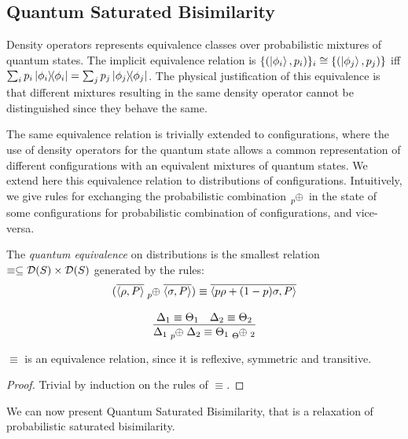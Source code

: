 
\subsection{Quantum Saturated Bisimilarity}

Density operators represents equivalence classes over probabilistic mixtures of quantum states.
The implicit equivalence relation is $\{(\ket{\phi_i}, p_i)\}_i \cong \{(\ket{\phi_j}, p_j)\}$ iff $\sum_{i} p_i \ket{\phi_i}\!\!\bra{\phi_i} = \sum_{j} p_j \ket{\phi_j}\!\!\bra{\phi_j}$.
The physical justification of this equivalence is that different mixtures resulting in the same density operator cannot be distinguished since they behave the same.

The same equivalence relation is trivially extended to configurations, where the use of density operators for the quantum state allows a common representation of different configurations with an equivalent mixtures of quantum states. 
We extend here this equivalence relation to distributions of configurations.
Intuitively, we give rules for exchanging the probabilistic combination $\psum{p}$ in the state of some configurations for probabilistic combination of configurations, and vice-versa. 

\begin{definition}
	The \emph{quantum equivalence} on distributions is the smallest  relation  $\equiv \subseteq \mathcal{D}(S) \times \mathcal{D}(S)$ generated by the rules:
	\begin{gather*}
	(\overline{\confw{\rho, P}} \psum{p} \overline{\confw{\sigma, P}}) \equiv \overline{\confw{p \rho + (1-p)\sigma, P}}
	\\[0.3cm]
	\infer{\Delta_1 \psum{p} \Delta_2 \equiv \Theta_1 \psum \Theta_2}{\Delta_1 \equiv \Theta_1 & \Delta_2 \equiv \Theta_2}
	\end{gather*}
	\end{definition}
	
	\begin{theorem}
	$\equiv$ is an equivalence relation, since it is reflexive, symmetric and transitive.
	\end{theorem}
	\begin{proof}
	Trivial by induction on the rules of $\equiv$.
	\end{proof}


We can now present Quantum Saturated Bisimilarity, that is a relaxation of probabilistic saturated bisimilarity. 

